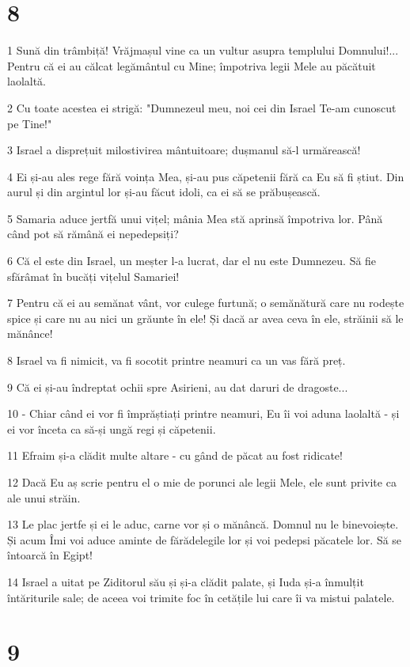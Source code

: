 \chapter{8}

\par 1 Sună din trâmbiță! Vrăjmașul vine ca un vultur asupra templului Domnului!... Pentru că ei au călcat legământul cu Mine; împotriva legii Mele au păcătuit laolaltă.
\par 2 Cu toate acestea ei strigă: "Dumnezeul meu, noi cei din Israel Te-am cunoscut pe Tine!"
\par 3 Israel a disprețuit milostivirea mântuitoare; dușmanul să-l urmărească!
\par 4 Ei și-au ales rege fără voința Mea, și-au pus căpetenii fără ca Eu să fi știut. Din aurul și din argintul lor și-au făcut idoli, ca ei să se prăbușească.
\par 5 Samaria aduce jertfă unui vițel; mânia Mea stă aprinsă împotriva lor. Până când pot să rămână ei nepedepsiți?
\par 6 Că el este din Israel, un meșter l-a lucrat, dar el nu este Dumnezeu. Să fie sfărâmat în bucăți vițelul Samariei!
\par 7 Pentru că ei au semănat vânt, vor culege furtună; o semănătură care nu rodește spice și care nu au nici un grăunte în ele! Și dacă ar avea ceva în ele, străinii să le mănânce!
\par 8 Israel va fi nimicit, va fi socotit printre neamuri ca un vas fără preț.
\par 9 Că ei și-au îndreptat ochii spre Asirieni, au dat daruri de dragoste...
\par 10 - Chiar când ei vor fi împrăștiați printre neamuri, Eu îi voi aduna laolaltă - și ei vor înceta ca să-și ungă regi și căpetenii.
\par 11 Efraim și-a clădit multe altare - cu gând de păcat au fost ridicate!
\par 12 Dacă Eu aș scrie pentru el o mie de porunci ale legii Mele, ele sunt privite ca ale unui străin.
\par 13 Le plac jertfe și ei le aduc, carne vor și o mănâncă. Domnul nu le binevoiește. Și acum Îmi voi aduce aminte de fărădelegile lor și voi pedepsi păcatele lor. Să se întoarcă în Egipt!
\par 14 Israel a uitat pe Ziditorul său și și-a clădit palate, și Iuda și-a înmulțit întăriturile sale; de aceea voi trimite foc în cetățile lui care îi va mistui palatele.

\chapter{9}

